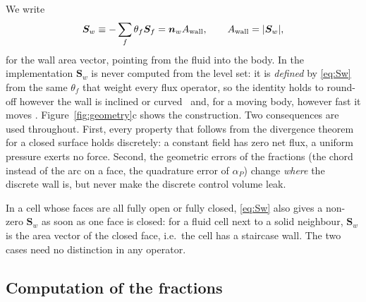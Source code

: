 \documentclass[11pt,a4paper]{article}
\theoremstyle{remark}
\newcommand{\nn}{\bm{n}}
\newcommand{\Sf}{\bm{S}_f}
\newcommand{\Sw}{\bm{S}_w}
\newcommand{\Aw}{A_{\rm wall}}
\begin{document}
We write
\begin{equation}
\Sw\equiv-\sum_f\theta_f\Sf=\nn_w\Aw,\qquad \Aw=|\Sw|,
\label{eq:Sw}
\end{equation}
for the wall area vector, pointing from the fluid into the body. In the implementation $\Sw$
is never computed from the level set: it is \emph{defined} by \eqref{eq:Sw} from the same
$\theta_f$ that weight every flux operator, so the identity holds to round-off however the wall
is inclined or curved%
\ and, for a moving body, however fast it moves%
. Figure~\ref{fig:geometry}c shows the construction. Two consequences are used throughout.
First, every property that follows from the divergence theorem for a closed surface holds
discretely: a constant field has zero net flux, a uniform pressure exerts no force. Second,
the geometric errors of the fractions (the chord instead of the arc on a face, the
quadrature error of $\alpha_P$) change \emph{where} the discrete wall is, but never make the
discrete control volume leak.

In a cell whose faces are all fully open or fully closed, \eqref{eq:Sw} also gives a
non-zero $\Sw$ as soon as one face is closed: for a fluid cell next to a solid neighbour,
$\Sw$ is the area vector of the closed face, i.e.\ the cell has a staircase wall. The two
cases need no distinction in any operator.

\subsection{Computation of the fractions}
\label{sec:geomcomp}
\end{document}
